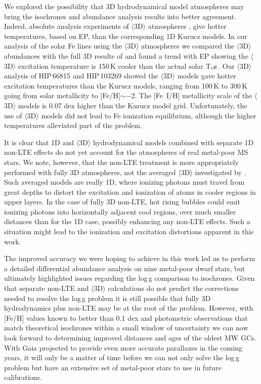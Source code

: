 \documentclass[revtex4]{emulateapj}
\begin{document}
We explored the possibility that 3D hydrodynamical model atmospheres may bring the isochrones and abundance analysis results into better agreement.  Indeed, absolute analysis experiments \citep[e.g.][]{Berg2012} of $\langle$3D$\rangle$ atmospheres \citep[e.g.][]{Magic2013}, give hotter temperatures, based on EP, than the corresponding 1D Kurucz models.  In our analysis of the solar Fe lines using the \citet{Magic2013} $\langle$3D$\rangle$ atmospheres we compared the $\langle$3D$\rangle$ abundances with the full 3D results of \citet{Asplund2000} and found a trend with EP showing the $\langle$3D$\rangle$ excitation temperature is 150\,K cooler than the actual solar T$_{\rm eff}$.  Our $\langle$3D$\rangle$ analysis of HIP\,66815 and HIP\,103269 showed the $\langle$3D$\rangle$ models gave hotter excitation temperatures than the Kurucz models, ranging from 100\,K to 300\,K going from solar metallicity to [Fe/H]$\sim$$-$2.  The [Fe~I/H] metallicity scale of the $\langle$3D$\rangle$ models is 0.07 dex higher than the Kurucz model grid.  Unfortunately, the use of $\langle$3D$\rangle$ models did not lead to Fe ionization equilibrium, although the higher temperatures alleviated part of the problem.  

It is clear that 1D and $\langle$3D$\rangle$ hydrodynamical models combined with separate 1D non-LTE effects do not yet account for the atmospheres of real metal-poor MS stars.  We note, however, that the non-LTE treatment is more appropriately performed with fully 3D atmospheres, not the averaged $\langle$3D$\rangle$ investigated by \citet{Berg2012}.  Such averaged models are really 1D, where ionizing photons must travel from great depths to distort the excitation and ionization of atoms in cooler regions in upper layers.  In the case of fully 3D non-LTE, hot rising bubbles could emit ionizing photons into horizontally adjacent cool regions, over much smaller distances than for the 1D case, possibly enhancing any non-LTE effects.  Such a situation might lead to the ionization and excitation distortions apparent in this work.

The improved accuracy we were hoping to achieve in this work led us to perform a detailed differential abundance analysis on nine metal-poor dwarf stars, but ultimately highlighted issues regarding the log\,g comparison to isochrones.  Given that separate non-LTE and $\langle$3D$\rangle$ calculations do not predict the corrections needed to resolve the log\,g problem it is still possible that fully 3D hydrodynamics plus non-LTE may be at the root of the problem.  However, with [Fe/H] values known to better than 0.1 dex and photometric observations that match theoretical isochrones within a small window of uncertainty we can now look forward to determining improved distances and ages of the oldest MW GCs.  With Gaia projected to provide even more accurate parallaxes in the coming years, it will only be a matter of time before we can not only solve the log\,g problem but have an extensive set of metal-poor stars to use in future calibrations.
\end{document}

